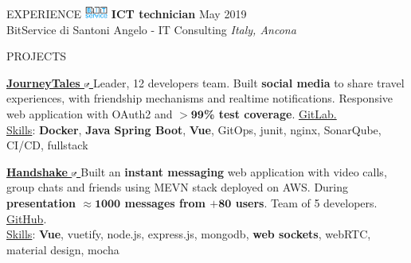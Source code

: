 \documentclass{cv} %
\def\intraexpvspace{0.15cm}
\begin{document}
\begin{minipage}[l]{0.7\linewidth}
\begin{rSection}{EXPERIENCE}
    \includegraphics[width=0.75cm, trim={0cm 1.5cm 0cm 0cm}]{bitservice-icon.png}
    \textbf{ICT technician} \hfill May 2019 \\
    \hspace*{0.85cm}BitService di Santoni Angelo - IT Consulting \hfill \textit{Italy, Ancona}
\end{rSection}

\begin{rSection}{PROJECTS}
    \item \textbf{\href{https://pufferfish.sa4.usi.ch/login}
        {
            JourneyTales
            \includegraphics[width=0.15cm, trim={10cm -10cm 0cm 0cm}]{ext-link-icon.png}
        }}
    {Leader, 12 developers team.
        Built \textbf{social media} to share travel experiences,
        with friendship mechanisms and realtime notifications.
        Responsive web application with OAuth2 and $\boldsymbol{> 99}$\textbf{\% test coverage}.
        \href{https://gitlab.com/usi-si-oss/teaching/projects-showcase/sa4/team-4-pufferfish}{GitLab.}
    }\\[0.1cm]
    \hspace*{0.5cm}\underline{Skills}:
    \textbf{Docker},
    \textbf{Java Spring Boot},
    \textbf{Vue},
    GitOps,
    junit,
    nginx,
    SonarQube,
    CI/CD,
    fullstack

    \vspace{\intraexpvspace}
    \item \textbf{\href{https://handshakeapp.ch}{
            Handshake
            \includegraphics[width=0.15cm, trim={10cm -10cm 0cm 0cm}]{ext-link-icon.png}
        }}
    {Built an \textbf{instant messaging} web application with video calls, group chats and friends
        using MEVN stack deployed on AWS.
        During \textbf{presentation $\boldsymbol{\approx1000}$ messages from $\boldsymbol{+80}$ users}.
        Team of 5 developers.
        \href{https://github.com/ogs-at-usi/handshake}{GitHub}.
    }\\[0.1cm]
    \hspace*{0.5cm}\underline{Skills}:
    \textbf{Vue},
    vuetify,
    node.js,
    express.js,
    mongodb,
    \textbf{web sockets},
    webRTC, %
    material design,
    mocha
\end{rSection}


\end{minipage}
\end{document}
